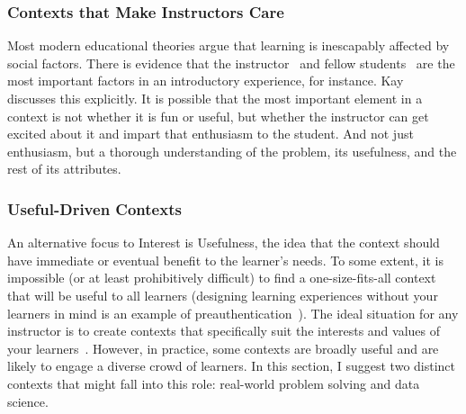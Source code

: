 \subsubsection{Contexts that Make Instructors Care}

Most modern educational theories argue that learning is inescapably affected by social factors.
There is evidence that the instructor~\cite{thompson2009engine} and fellow students~\cite{Barker:2009} are the most important factors in an introductory experience, for instance.
Kay~\cite{Kay:2011} discusses this explicitly.
It is possible that the most important element in a context is not whether it is fun or useful, but whether the instructor can get excited about it and impart that enthusiasm to the student.
And not just enthusiasm, but a thorough understanding of the problem, its usefulness, and the rest of its attributes.

\subsubsection{Useful-Driven Contexts}

An alternative focus to Interest is Usefulness, the idea that the context should have immediate or eventual benefit to the learner's needs.
To some extent, it is impossible (or at least prohibitively difficult) to find a one-size-fits-all context that will be useful to all learners (designing learning experiences without your learners in mind is an example of preauthentication~\cite{preauthentication}).
The ideal situation for any instructor is to create contexts that specifically suit the interests and values of your learners~\cite{DiSalvo:2011}.
However, in practice, some contexts are broadly useful and are likely to engage a diverse crowd of learners.
In this section, I suggest two distinct contexts that might fall into this role: real-world problem solving and data science.


